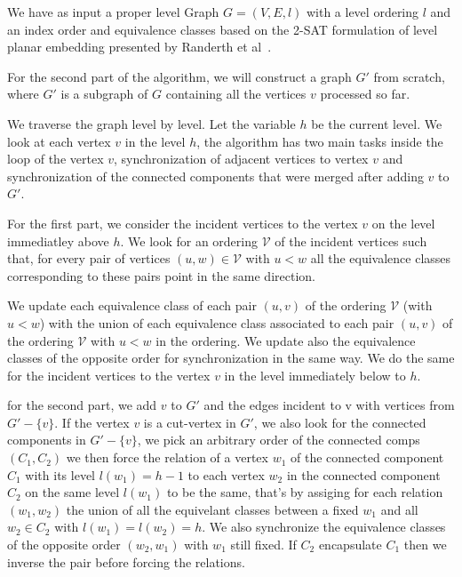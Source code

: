 \documentclass[a4paper]{article}
\begin{document}
We have as input a proper level Graph $G = (V,E,l)$  with a level ordering $l$ and an index order and equivalence classes based 
on the 2-SAT formulation of level planar embedding presented by Randerth et al~\cite{randerath2001satisfiability}. 

For the second part of the algorithm, we will construct a graph $G'$ from scratch, where $G'$ is a subgraph of $G$ containing 
all the vertices $v$ processed so far. 

We traverse the graph level by level. Let the variable $h$ be the current level. 
We look at each vertex $v$ in the level $h$, the algorithm has two main tasks inside the loop of the vertex $v$, 
synchronization of adjacent vertices to vertex $v$ and synchronization of the connected components that were merged after adding $v$ to $G'$.

For the first part, we consider the incident vertices to the vertex $v$ on the level immediatley above $h$. We look for an ordering $\mathcal{V}$ of the 
incident vertices such that, for every pair of vertices $\left( u,w \right) \in \mathcal{V}$ with $u < w$ all the equivalence 
classes corresponding to these pairs point in the same direction. 

We update each equivalence class of each pair $(u,v)$ of the ordering $\mathcal{V}$ (with $u < w$) with the union of each equivalence class associated to 
each pair $(u,v)$ of the ordering $\mathcal{V}$ with $u < w$ in the ordering. We update also the 
equivalence classes of the opposite order for synchronization in the same way. We do the same for the incident vertices to the vertex $v$ in the level immediately below to $h$.


for the second part, we add $v$ to $G'$ and the edges incident to v with vertices from $G'-\{v\}$.
If the vertex $v$ is a cut-vertex in $G'$, we also look for the connected components in $G'-\{v\}$, we pick an arbitrary order of the 
connected comps $(C_1,C_2)$ we then force the relation of a vertex $w_1$ of the connected component $C_1$ with its level $l(w_1) = h - 1$ 
to each vertex $w_2$ in the connected component $C_2$ on the same level $l(w_1)$ to be the same, that's by assiging for each relation $(w_1,w_2)$
the union of all the equivelant classes between a fixed $w_1$ and all $w_2 \in C_2$ with $l(w_1) = l(w_2) = h$. We also synchronize the equivalence classes of 
the opposite order $\left( w_2, w_1 \right)$ with $w_1$ still fixed. If $C_2$ encapsulate $C_1$ then we inverse the pair before forcing the relations. 
 {}



   
\end{document}

